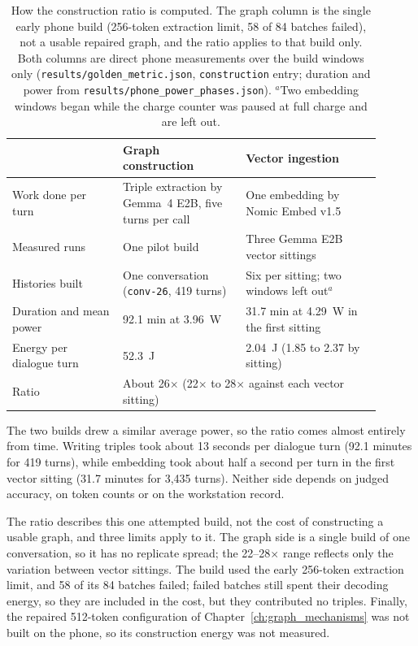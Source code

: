 \begin{table}[htbp]
  \centering
  \small
  \begin{tabular}{p{0.27\linewidth}p{0.30\linewidth}p{0.33\linewidth}}
    \toprule
    & Graph construction & Vector ingestion \\
    \midrule
    Work done per turn & Triple extraction by Gemma~4 E2B, five turns per call & One embedding by Nomic
    Embed v1.5 \\
    Measured runs & One pilot build & Three Gemma E2B vector sittings \\
    Histories built & One conversation (\texttt{conv-26}, 419 turns) & Six per sitting; two windows
    left out$^{a}$ \\
    Duration and mean power & 92.1 min at 3.96~W & 31.7 min at 4.29~W in the first sitting \\
    Energy per dialogue turn & 52.3~J & 2.04~J (1.85 to 2.37 by sitting) \\
    \midrule
    Ratio & \multicolumn{2}{l}{About 26$\times$ (22$\times$ to 28$\times$ against each vector sitting)} \\
    \bottomrule
  \end{tabular}
  \caption{How the construction ratio is computed. The graph column is the single early phone build
  (256-token extraction limit, 58 of 84 batches failed), not a usable repaired graph, and the ratio
  applies to that build only. Both columns are direct phone measurements over the build windows only (\texttt{results/golden\_metric.json}, \texttt{construction} entry;
  duration and power from \texttt{results/phone\_power\_phases.json}). $^{a}$Two embedding windows
  began while the charge counter was paused at full charge and are left out.}
  \label{tab:ch5_construction}
\end{table}

The two builds drew a similar average power, so the ratio comes almost entirely from time. Writing
triples took about 13 seconds per dialogue turn (92.1 minutes for 419 turns), while embedding took
about half a second per turn in the first vector sitting (31.7 minutes for 3,435 turns). Neither
side depends on judged accuracy, on token counts or on the workstation record.

The ratio describes this one attempted build, not the cost of constructing a usable graph, and three
limits apply to it. The graph side is a single build of one conversation, so it has no replicate
spread; the 22--28$\times$ range reflects only the variation between vector sittings. The build used
the early 256-token extraction limit, and 58 of its 84 batches failed; failed batches still spent
their decoding energy, so they are included in the cost, but they contributed no triples. Finally,
the repaired 512-token configuration of Chapter~\ref{ch:graph_mechanisms} was not built on the phone,
so its construction energy was not measured.


